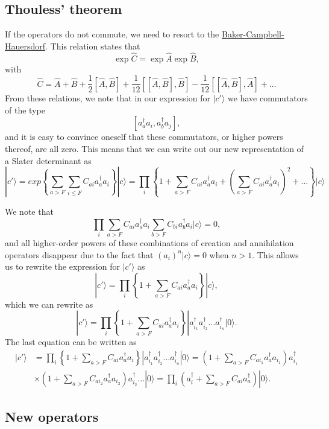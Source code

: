 \documentclass[%
oneside,                 %
final,                   %
10pt]{article}
\begin{document}
\subsection*{Thouless' theorem}

If the operators do not commute, we need to resort to the \href{{http://www.encyclopediaofmath.org/index.php/Campbell%
\[
\exp{\hat{C}}=\exp{\hat{A}}\exp{\hat{B}},
\]
with 
\[
\hat{C}=\hat{A}+\hat{B}+\frac{1}{2}[\hat{A},\hat{B}]+\frac{1}{12}[[\hat{A},\hat{B}],\hat{B}]-\frac{1}{12}[[\hat{A},\hat{B}],\hat{A}]+\dots
\]
From these relations, we note that 
in our expression  for $|c'\rangle$ we have commutators of the type
\[
[a_{a}^{\dagger}a_{i},a_{b}^{\dagger}a_{j}],
\]
and it is easy to convince oneself that these commutators, or higher powers thereof, are all zero. This means that we can write out our new representation of a Slater determinant as
\[
|c'\rangle=exp\left\{\sum_{a>F}\sum_{i\le F}C_{ai}a_{a}^{\dagger}a_{i}\right\}| c\rangle=\prod_{i}\left\{1+\sum_{a>F}C_{ai}a_{a}^{\dagger}a_{i}+\left(\sum_{a>F}C_{ai}a_{a}^{\dagger}a_{i}\right)^2+\dots\right\}| c\rangle
\]

We note that
\[
\prod_{i}\sum_{a>F}C_{ai}a_{a}^{\dagger}a_{i}\sum_{b>F}C_{bi}a_{b}^{\dagger}a_{i}| c\rangle =0,
\]
and all higher-order powers of these combinations of creation and annihilation operators disappear 
due to the fact that $(a_i)^n| c\rangle =0$ when $n > 1$. This allows us to rewrite the expression for $|c'\rangle $ as
\[
|c'\rangle=\prod_{i}\left\{1+\sum_{a>F}C_{ai}a_{a}^{\dagger}a_{i}\right\}| c\rangle,
\]
which we can rewrite as 
\[
|c'\rangle=\prod_{i}\left\{1+\sum_{a>F}C_{ai}a_{a}^{\dagger}a_{i}\right\}| a^{\dagger}_{i_1} a^{\dagger}_{i_2} \dots a^{\dagger}_{i_n}|0\rangle.
\]
The last equation can be written as
\begin{align}
|c'\rangle&=\prod_{i}\left\{1+\sum_{a>F}C_{ai}a_{a}^{\dagger}a_{i}\right\}| a^{\dagger}_{i_1} a^{\dagger}_{i_2} \dots a^{\dagger}_{i_n}|0\rangle=\left(1+\sum_{a>F}C_{ai_1}a_{a}^{\dagger}a_{i_1}\right)a^{\dagger}_{i_1} \\
& \times\left(1+\sum_{a>F}C_{ai_2}a_{a}^{\dagger}a_{i_2}\right)a^{\dagger}_{i_2} \dots |0\rangle=\prod_{i}\left(a^{\dagger}_{i}+\sum_{a>F}C_{ai}a_{a}^{\dagger}\right)|0\rangle.
\end{align}

\subsection*{New operators}
\end{document}
